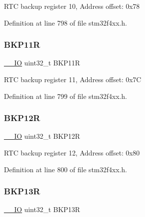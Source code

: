 R\+TC backup register 10, Address offset\+: 0x78 

Definition at line 798 of file stm32f4xx.\+h.

\mbox{\label{struct_r_t_c___type_def_ac66d5e2d3459cff89794c47dbc8f7228}} 
\subsubsection{\texorpdfstring{B\+K\+P11R}{BKP11R}}
{\footnotesize\ttfamily \hyperlink{group___c_m_s_i_s__core__definitions_gaec43007d9998a0a0e01faede4133d6be}{\+\_\+\+\_\+\+IO} uint32\+\_\+t B\+K\+P11R}

R\+TC backup register 11, Address offset\+: 0x7C 

Definition at line 799 of file stm32f4xx.\+h.

\mbox{\label{struct_r_t_c___type_def_a6f7eee5ae8a32c07f9c8fe14281bdaf3}} 
\subsubsection{\texorpdfstring{B\+K\+P12R}{BKP12R}}
{\footnotesize\ttfamily \hyperlink{group___c_m_s_i_s__core__definitions_gaec43007d9998a0a0e01faede4133d6be}{\+\_\+\+\_\+\+IO} uint32\+\_\+t B\+K\+P12R}

R\+TC backup register 12, Address offset\+: 0x80 

Definition at line 800 of file stm32f4xx.\+h.

\mbox{\label{struct_r_t_c___type_def_a6ed4c3a0d4588a75078e9f8e376b4d06}} 
\subsubsection{\texorpdfstring{B\+K\+P13R}{BKP13R}}
{\footnotesize\ttfamily \hyperlink{group___c_m_s_i_s__core__definitions_gaec43007d9998a0a0e01faede4133d6be}{\+\_\+\+\_\+\+IO} uint32\+\_\+t B\+K\+P13R}

